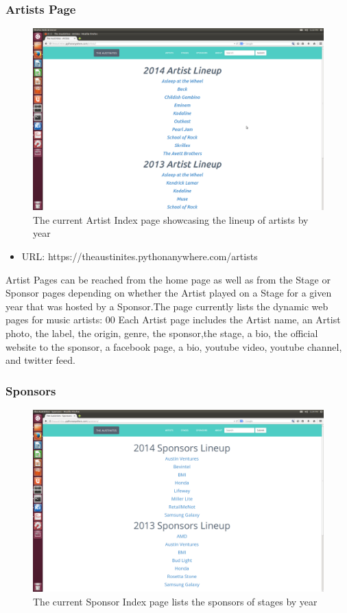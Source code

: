 \documentclass[12pt,english]{scrartcl}
\begin{document}
\subsubsection{Artists Page}
\begin{figure}
\includegraphics[width=\textwidth]{artists.png}
 \caption{The current Artist Index page showcasing the lineup of artists by year}
\end{figure}

\begin{itemize}
 \item URL: https://theaustinites.pythonanywhere.com/artists
\end{itemize}

Artist Pages can be reached from the home page as well as from the Stage or Sponsor pages depending on whether the Artist played on
a Stage for a given year that was hosted by a Sponsor.The page currently lists the dynamic web pages for music artists:
00
Each Artist page includes the Artist name, an Artist photo, the label, the origin, genre, the sponsor,the stage, a bio,
the official website to the sponsor, a facebook page, a bio, youtube video, youtube channel, and twitter feed.

\subsubsection{Sponsors}
\begin{figure}
\includegraphics[width=\textwidth]{sponsors.png}
 \caption{The current Sponsor Index page lists the sponsors of stages by year}
\end{figure}
\end{document}
